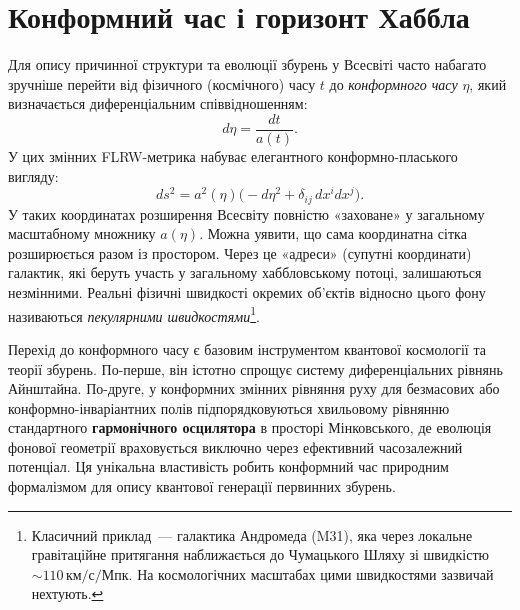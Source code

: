 \section{Конформний час і горизонт Хаббла}
\label{sec:horizon}

Для опису причинної структури та еволюції збурень у Всесвіті часто набагато зручніше перейти від фізичного (космічного) часу $t$ до \emph{конформного часу} $\eta$, який визначається диференціальним співвідношенням:
\begin{equation*}
  d\eta = \frac{dt}{a(t)}.
\end{equation*}
У цих змінних FLRW-метрика набуває елегантного конформно-пласького вигляду:
\begin{equation*}
  ds^2 = a^2(\eta)\bigl(-d\eta^2 + \delta_{ij}\,dx^i dx^j\bigr).
\end{equation*}
У таких координатах розширення Всесвіту повністю «заховане» у загальному масштабному множнику $a(\eta)$. Можна уявити, що сама координатна сітка розширюється разом із простором. Через це «адреси» (супутні координати) галактик, які беруть участь у загальному хаббловському потоці, залишаються незмінними. Реальні фізичні швидкості окремих об'єктів відносно цього фону називаються \emph{пекулярними швидкостями}\footnote{Класичний приклад~--- галактика Андромеда (M31), яка через локальне гравітаційне притягання наближається до Чумацького Шляху зі швидкістю ${\sim}110\,\text{км/с/Мпк}$. На космологічних масштабах цими швидкостями зазвичай нехтують.}.

\begin{keybox}
Перехід до конформного часу є базовим інструментом квантової космології та теорії збурень. По-перше, він істотно спрощує систему диференціальних рівнянь Айнштайна. По-друге, у конформних змінних рівняння руху для безмасових або конформно-інваріантних полів підпорядковуються хвильовому рівнянню стандартного \textbf{гармонічного осцилятора} в просторі Мінковського, де еволюція фонової геометрії враховується виключно через ефективний часозалежний потенціал. Ця унікальна властивість робить конформний час природним формалізмом для опису квантової генерації первинних збурень.
\end{keybox}

